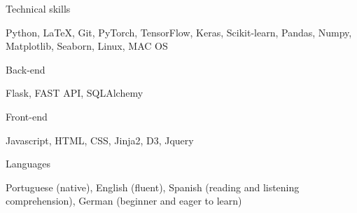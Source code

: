 

\begin{cventries}

\begin{cvskills}    
        
    \cvskill
    {Technical skills}
    {\begin{minipage}[t]{0.7\textwidth}
        Python, LaTeX, Git, PyTorch, TensorFlow, Keras, Scikit-learn, Pandas, Numpy, Matplotlib, Seaborn, Linux, MAC OS
    \end{minipage}
    }
    \cvskill
    {Back-end}
    {\begin{minipage}[t]{0.7\textwidth}
        Flask, FAST API, SQLAlchemy
    \end{minipage}
    }
    \cvskill
    {Front-end}
    {\begin{minipage}[t]{0.7\textwidth}
        Javascript, HTML, CSS, Jinja2, D3, Jquery
    \end{minipage}
    }
    \cvskill
    {Languages}
    {\begin{minipage}[t]{0.7\textwidth}
        Portuguese (native), English (fluent), Spanish (reading and listening comprehension), German (beginner and eager to learn)
    \end{minipage}
    }
\end{cvskills}  


\end{cventries}

